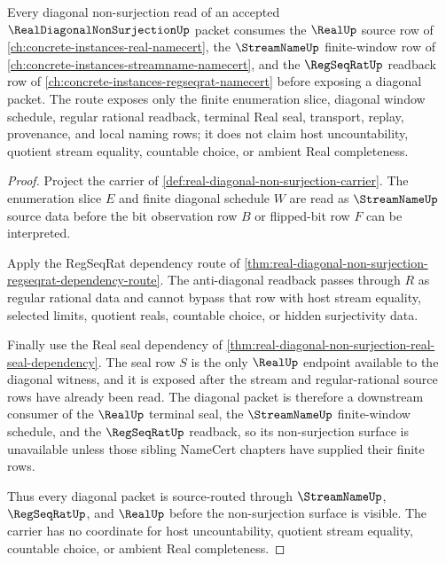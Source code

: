 \begin{theorem}
\label{thm:real-diagonal-non-surjection-real-source-route}
Every diagonal non-surjection read of an accepted $\RealDiagonalNonSurjectionUp$ packet consumes the $\RealUp$ source row of \autoref{ch:concrete-instances-real-namecert}, the $\StreamNameUp$ finite-window row of \autoref{ch:concrete-instances-streamname-namecert}, and the $\RegSeqRatUp$ readback row of \autoref{ch:concrete-instances-regseqrat-namecert} before exposing a diagonal packet. The route exposes only the finite enumeration slice, diagonal window schedule, regular rational readback, terminal Real seal, transport, replay, provenance, and local naming rows; it does not claim host uncountability, quotient stream equality, countable choice, or ambient Real completeness.
\end{theorem}
\begin{proof}
Project the carrier of \autoref{def:real-diagonal-non-surjection-carrier}. The enumeration slice $E$ and finite diagonal schedule $W$ are read as $\StreamNameUp$ source data before the bit observation row $B$ or flipped-bit row $F$ can be interpreted.

Apply the RegSeqRat dependency route of \autoref{thm:real-diagonal-non-surjection-regseqrat-dependency-route}. The anti-diagonal readback passes through $R$ as regular rational data and cannot bypass that row with host stream equality, selected limits, quotient reals, countable choice, or hidden surjectivity data.

Finally use the Real seal dependency of \autoref{thm:real-diagonal-non-surjection-real-seal-dependency}. The seal row $S$ is the only $\RealUp$ endpoint available to the diagonal witness, and it is exposed after the stream and regular-rational source rows have already been read. The diagonal packet is therefore a downstream consumer of the $\RealUp$ terminal seal, the $\StreamNameUp$ finite-window schedule, and the $\RegSeqRatUp$ readback, so its non-surjection surface is unavailable unless those sibling NameCert chapters have supplied their finite rows.

Thus every diagonal packet is source-routed through $\StreamNameUp$, $\RegSeqRatUp$, and $\RealUp$ before the non-surjection surface is visible. The carrier has no coordinate for host uncountability, quotient stream equality, countable choice, or ambient Real completeness.
\end{proof}

